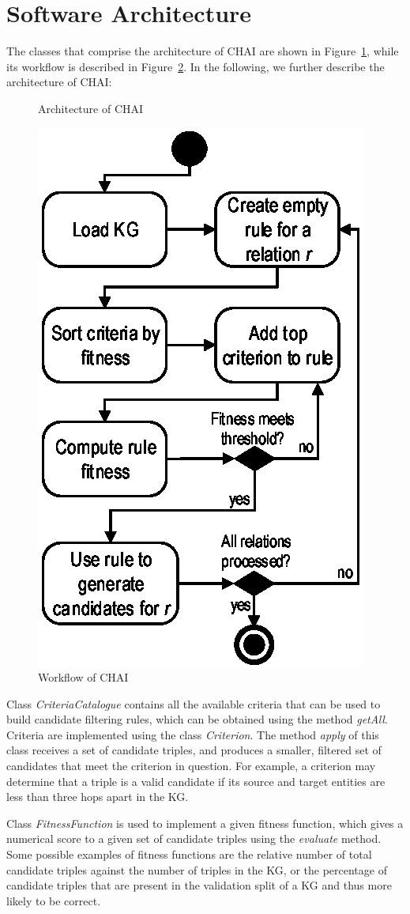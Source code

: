 \section{Software Architecture}\label{sec:chai-architecture}

The classes that comprise the architecture of CHAI are shown in Figure~\ref{fig:chai-diagram}, while its workflow is described in Figure~\ref{fig:chai-flow}. In the following, we further describe the architecture of CHAI: 

\begin{figure}[htp]
    \centering
    
    \caption{Architecture of CHAI}
    \label{fig:chai-diagram}
\end{figure}

\begin{figure}[htp]
    \centering
    \includegraphics[width=.35\textwidth]{fig/chai/CHAI-flow}
    \caption{Workflow of CHAI}
    \label{fig:chai-flow}
\end{figure}

Class \textit{CriteriaCatalogue} contains all the available criteria that can be used to build candidate filtering rules, which can be obtained using the method \textit{getAll}. Criteria are implemented using the class \textit{Criterion}. The method \textit{apply} of this class receives a set of candidate triples, and produces a smaller, filtered set of candidates that meet the criterion in question. For example, a criterion may determine that a triple is a valid candidate if its source and target entities are less than three hops apart in the KG.

Class \textit{FitnessFunction} is used to implement a given fitness function, which gives a numerical score to a given set of candidate triples using the \textit{evaluate} method. Some possible examples of fitness functions are the relative number of total candidate triples against the number of triples in the KG, or the percentage of candidate triples that are present in the validation split of a KG and thus more likely to be correct.

